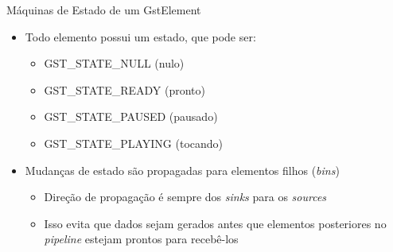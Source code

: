 \documentclass{beamer}
\def\en#1{\foreignlanguage{english}{\emph{#1}}}
\begin{document}
\begin{frame}[c]{Máquinas de Estado de um GstElement}
  \begin{itemize}
    \item Todo elemento possui um estado, que pode ser: 
      \begin{itemize}
        \item GST\_STATE\_NULL (nulo)
        \item GST\_STATE\_READY (pronto)
        \item GST\_STATE\_PAUSED (pausado)
        \item GST\_STATE\_PLAYING (tocando)
      \end{itemize}
    \item Mudanças de estado são propagadas para elementos filhos (\en{bins})
      \begin{itemize}
        \item Direção de propagação é sempre dos \en{sinks} para 
          os \en{sources}
        \item Isso evita que dados sejam gerados antes que elementos 
          posteriores no \en{pipeline} estejam prontos para recebê-los
      \end{itemize}
  \end{itemize}

  \begin{figure}[h]
    \centering
  \end{figure}


\end{frame}
\end{document}

